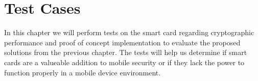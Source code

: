 \chapter{Test Cases}
In this chapter we will perform tests on the smart card regarding cryptographic performance and proof of concept implementation to evaluate the proposed solutions from the previous chapter. The tests will help us determine if smart cards are a valueable addition to mobile security or if they lack the power to function properly in a mobile device environment.







